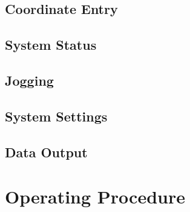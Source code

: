 \documentclass{article}
\begin{document}
\subsection{Coordinate Entry}
\subsection{System Status}
\subsection{Jogging}
\subsection{System Settings}
\subsection{Data Output}

\section{Operating Procedure}
\end{document}
